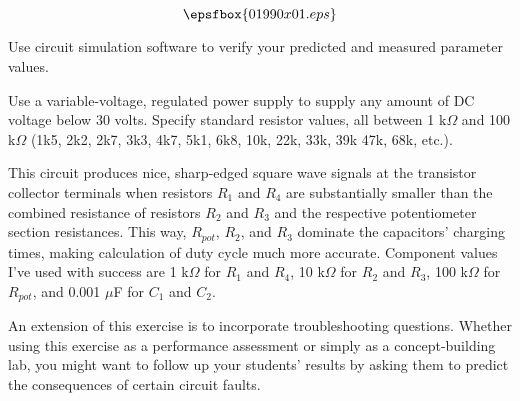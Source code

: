 

$$\epsfbox{01990x01.eps}$$

\vfil \eject






Use circuit simulation software to verify your predicted and measured parameter values.







Use a variable-voltage, regulated power supply to supply any amount of DC voltage below 30 volts.  Specify standard resistor values, all between 1 k$\Omega$ and 100 k$\Omega$ (1k5, 2k2, 2k7, 3k3, 4k7, 5k1, 6k8, 10k, 22k, 33k, 39k 47k, 68k, etc.). 

This circuit produces nice, sharp-edged square wave signals at the transistor collector terminals when resistors $R_1$ and $R_4$ are substantially smaller than the combined resistance of resistors $R_2$ and $R_3$ and the respective potentiometer section resistances.  This way, $R_{pot}$, $R_2$, and $R_3$ dominate the capacitors' charging times, making calculation of duty cycle much more accurate.  Component values I've used with success are 1 k$\Omega$ for $R_1$ and $R_4$, 10 k$\Omega$ for $R_2$ and $R_3$, 100 k$\Omega$ for $R_{pot}$, and 0.001 $\mu$F for $C_1$ and $C_2$.

An extension of this exercise is to incorporate troubleshooting questions.  Whether using this exercise as a performance assessment or simply as a concept-building lab, you might want to follow up your students' results by asking them to predict the consequences of certain circuit faults.




